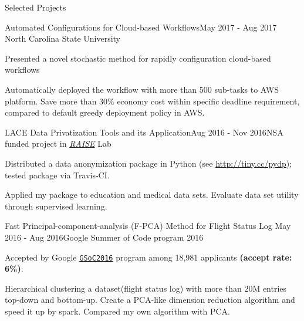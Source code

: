 \documentclass{resume} %
\begin{document}
\begin{rSection}{Selected Projects}

\begin{rSubsection}{Automated Configurations for Cloud-based Workflows}{May 2017 - Aug 2017}
{North Carolina State University}{}
\item Presented a novel stochastic method for rapidly configuration cloud-based workflows
\item Automatically deployed the workflow with more than 500 sub-tasks to AWS platform. Save more than 30\% economy cost within specific deadline requirement, compared to default greedy deployment policy in AWS.
\end{rSubsection}

\begin{rSubsection}{LACE Data Privatization Tools and its Application}{Aug 2016 - Nov 2016}{NSA funded project in \href{http://ai4se.net/index}{\textit{RAISE}} Lab}{}

\item Distributed a data anonymization  package in Python (see \url{http://tiny.cc/pydp}); tested package via Travis-CI.
\item Applied my package to education and medical data sets. Evaluate data set utility through supervised learning.
\end{rSubsection}


\begin{rSubsection}{Fast Principal-component-analysis (F-PCA) Method for Flight Status Log} {May 2016 - Aug 2016}{Google Summer of Code program 2016}{}
\item Accepted by Google \href{https://developers.google.com/open-source/gsoc/}{\texttt{GSoC2016}}  program among 18,981 applicants \textbf{(accept rate: 6\%)}.
\item Hierarchical clustering a dataset(flight status log) with more than 20M entries top-down and bottom-up. Create a PCA-like dimension reduction algorithm and speed it up by spark. Compared my own algorithm with PCA.
\end{rSubsection}  


\end{rSection}
\end{document}
